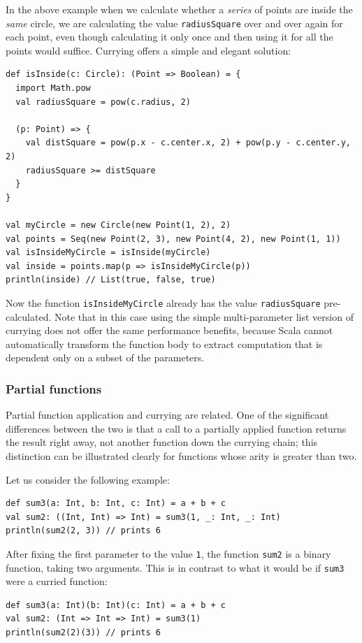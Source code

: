In the above example when we calculate whether a \emph{series} of points are inside the \emph{same} circle, we are calculating the value \texttt{radiusSquare} over and over again for each point, even though calculating it only once and then using it for all the points would suffice. Currying offers a simple and elegant solution:
\begin{lstlisting}
def isInside(c: Circle): (Point => Boolean) = {
  import Math.pow
  val radiusSquare = pow(c.radius, 2)

  (p: Point) => {
    val distSquare = pow(p.x - c.center.x, 2) + pow(p.y - c.center.y, 2)
    radiusSquare >= distSquare
  }
}

val myCircle = new Circle(new Point(1, 2), 2)
val points = Seq(new Point(2, 3), new Point(4, 2), new Point(1, 1))
val isInsideMyCircle = isInside(myCircle)
val inside = points.map(p => isInsideMyCircle(p))
println(inside) // List(true, false, true)
\end{lstlisting}

Now the function \texttt{isInsideMyCircle} already has the value \texttt{radiusSquare} pre-calculated. Note that in this case using the simple multi-parameter list version of currying does not offer the same performance benefits, because Scala cannot automatically transform the function body to extract computation that is dependent only on a subset of the parameters.

\subsubsection{Partial functions}

Partial function application and currying are related. One of the significant differences between the two is that a call to a partially applied function returns the result right away, not another function down the currying chain; this distinction can be illustrated clearly for functions whose arity is greater than two.

Let us consider the following example:
\begin{lstlisting}
def sum3(a: Int, b: Int, c: Int) = a + b + c
val sum2: ((Int, Int) => Int) = sum3(1, _: Int, _: Int)
println(sum2(2, 3)) // prints 6
\end{lstlisting}

After fixing the first parameter to the value \texttt{1}, the function \texttt{sum2} is a binary function, taking two arguments. This is in contrast to what it would be if \texttt{sum3} were a curried function:
\begin{lstlisting}
def sum3(a: Int)(b: Int)(c: Int) = a + b + c
val sum2: (Int => Int => Int) = sum3(1)
println(sum2(2)(3)) // prints 6
\end{lstlisting}

